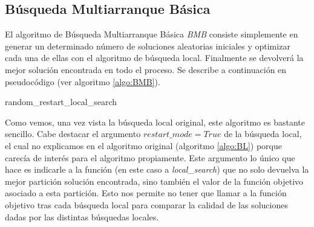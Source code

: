 \documentclass[11pt,a4paper]{article}
\begin{document}
	\subsection{Búsqueda Multiarranque Básica}
	El algoritmo de Búsqueda Multiarranque Básica \textit{BMB} consiste simplemente en generar un determinado número de soluciones aleatorias iniciales y optimizar cada una de ellas con el algoritmo de búsqueda local. Finalmente se devolverá la mejor solución encontrada en todo el proceso. Se describe a continuación en pseudocódigo (ver algoritmo \ref{algo:BMB}).
	
	\begin{algorithm}
	 	\caption{random\_restart\_local\_search} \label{algo:BMB}
	\end{algorithm}
	Como vemos, una vez vista la búsqueda local original, este algoritmo es bastante sencillo. Cabe destacar el argumento $restart\_mode = True$ de la búsqueda local, el cual no explicamos en el algoritmo original (algoritmo \ref{algo:BL}) porque carecía de interés para el algoritmo propiamente. Este argumento lo único que hace es indicarle a la función (en este caso a \textit{local\_search}) que no solo devuelva la mejor partición solución encontrada, sino también el valor de la función objetivo asociado a esta partición. Esto nos permite no tener que llamar a la función objetivo tras cada búsqueda local para comparar la calidad de las soluciones dadas por las distintas búsquedas locales. 
	
\end{document}
